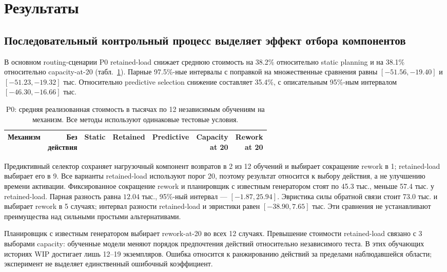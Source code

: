 \section{Результаты}
\subsection{Последовательный контрольный процесс выделяет эффект отбора компонентов}
В основном routing-сценарии P0 retained-load снижает среднюю стоимость на 38.2\% относительно static planning и на 38.1\% относительно capacity-at-20 (табл.~\ref{tab:primary}). Парные 97.5\%-ные интервалы с поправкой на множественные сравнения равны $[-51.56,-19.40]$ и $[-51.23,-19.32]$ тыс. Относительно predictive selection снижение составляет 35.4\%, с описательным 95\%-ным интервалом $[-46.30,-16.66]$ тыс.

\begin{table}[t]\caption{P0: средняя реализованная стоимость в тысячах по 12 независимым обучениям на механизм. Все методы используют одинаковые тестовые условия.}\label{tab:primary}\centering\small\setlength{\tabcolsep}{3pt}
\begin{tabular}{lrrrrrr}\toprule
Механизм & \shortstack{Без\\действия} & Static & Retained & Predictive & \shortstack{Capacity\\at 20} & \shortstack{Rework\\at 20}\\\midrule

\end{tabular}\end{table}

Предиктивный селектор сохраняет нагрузочный компонент возвратов в 2 из 12 обучений и выбирает сокращение rework в 1; retained-load выбирает его в 9. Все варианты retained-load используют порог 20, поэтому результат относится к выбору действия, а не улучшению времени активации. Фиксированное сокращение rework и планировщик с известным генератором стоят по 45.3 тыс., меньше 57.4 тыс. у retained-load. Парная разность равна $12.04$ тыс., 95\%-ный интервал — $[-1.87,25.94]$. Эвристика силы обратной связи стоит 73.0 тыс. и выбирает rework в 5 случаях; интервал разности retained-load и эвристики равен $[-38.90,7.65]$ тыс. Эти сравнения не устанавливают преимущества над сильными простыми альтернативами.

Планировщик с известным генератором выбирает rework-at-20 во всех 12 случаях. Превышение стоимости retained-load связано с 3 выборами capacity: обученные модели меняют порядок предпочтения действий относительно независимого теста. В этих обучающих историях WIP достигает лишь 12--19 экземпляров. Ошибка относится к ранжированию действий за пределами наблюдавшейся области; эксперимент не выделяет единственный ошибочный коэффициент.

